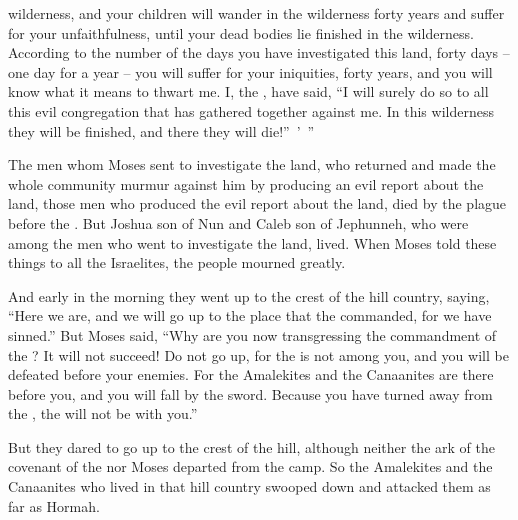{wilderness,
and your children
will wander
in the wilderness
forty
years
and suffer
for your unfaithfulness,
until
your dead bodies
lie finished in the wilderness.
According to the number
of the days
you have investigated
this land,
forty
days
– one day
for a year
– you will suffer for
your iniquities,
forty
years,
and you will know
what it means to thwart me.
I,
the {}, have said,
“I will
surely
do
so to all
this
evil
congregation
that has gathered
together against
me. In this
wilderness
they will be finished, and there
they will die!” ’ ”
\par }{\PP {}The men
whom
Moses
sent
to investigate
the land,
who returned
and made the whole
community
murmur against
him by producing
an evil report
about the land,
those men
who produced
the evil
report
about the land,
died
by
the plague
before
the
{}.
But Joshua
son
of Nun
and Caleb
son
of Jephunneh,
who were
among the men
who went
to investigate
the land,
lived.
When Moses
told
these
things to
all
the Israelites,
the people
mourned
greatly.
\par }{\PP {}And early
in the morning
they went up
to
the crest
of the hill country,
saying,
“Here
we are, and we will go up
to
the place
that
the {}
commanded, for
we have sinned.”
But Moses
said,
“Why
are you
now transgressing
the commandment
of the {}? It
will not
succeed!
Do not
go up,
for
the {}
is not
among
you, and you will be defeated
before
your enemies.
For
the Amalekites
and the Canaanites
are there
before
you, and you will fall
by the sword.
Because
you have
turned
away
from the
{}, the
{}
will not
be
with you.”
\par }{\PP {}But they dared
to go up
to
the crest
of the hill,
although neither the ark
of the covenant
of the {}
nor
Moses
departed
from the camp.
So
the Amalekites
and the Canaanites
who lived
in that hill country
swooped
down and attacked
them as far
as Hormah.


}

